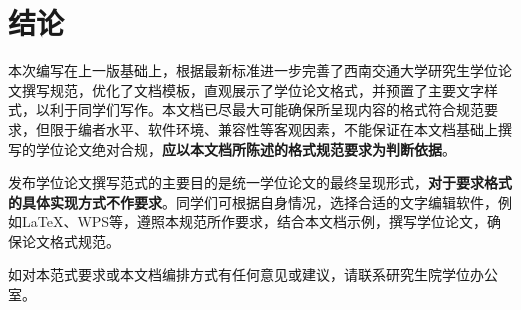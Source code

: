 \chapter{结论}\label{第4章}




本次编写在上一版基础上，根据最新标准进一步完善了西南交通大学研究生学位论文撰写规范，优化了文档模板，直观展示了学位论文格式，并预置了主要文字样式，以利于同学们写作。本文档已尽最大可能确保所呈现内容的格式符合规范要求，但限于编者水平、软件环境、兼容性等客观因素，不能保证在本文档基础上撰写的学位论文绝对合规，\textbf{应以本文档所陈述的格式规范要求为判断依据}。

发布学位论文撰写范式的主要目的是统一学位论文的最终呈现形式，\textbf{对于要求格式的具体实现方式不作要求}。同学们可根据自身情况，选择合适的文字编辑软件，例如LaTeX、WPS等，遵照本规范所作要求，结合本文档示例，撰写学位论文，确保论文格式规范。

如对本范式要求或本文档编排方式有任何意见或建议，请联系研究生院学位办公室。